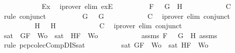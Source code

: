 \begin{isabellebody}
\ \ \ \ \ \ \ \ \ \ \isamarkupfalse%
\ Ex{}\ \isamarkupfalse%
\ {\isacharparenleft}iprover\ elim{\isacharcolon}\ exE{\isacharparenright}\isanewline
\ \ \ \ \ \ \ \ \isamarkupfalse%
\ {\isachardoublequoteopen}F\ {\isacharequal}\ \isactrlbold {\isasymnot}\ {\isacharparenleft}G{}\ \isactrlbold {\isasymand}\ H{}{\isacharparenright}{\isachardoublequoteclose}\isanewline
\ \ \ \ \ \ \ \ \ \ \isamarkupfalse%
\ C{}\ \isamarkupfalse%
\ {\isacharparenleft}rule\ conjunct{}{\isacharparenright}\isanewline
\ \ \ \ \ \ \ \ \isamarkupfalse%
\ {\isachardoublequoteopen}G\ {\isacharequal}\ \isactrlbold {\isasymnot}\ G{}{\isachardoublequoteclose}\isanewline
\ \ \ \ \ \ \ \ \ \ \isamarkupfalse%
\ C{}\ \isamarkupfalse%
\ {\isacharparenleft}iprover\ elim{\isacharcolon}\ conjunct{}{\isacharparenright}\isanewline
\ \ \ \ \ \ \ \ \isamarkupfalse%
\ {\isachardoublequoteopen}H\ {\isacharequal}\ \isactrlbold {\isasymnot}\ H{}{\isachardoublequoteclose}\isanewline
\ \ \ \ \ \ \ \ \ \ \isamarkupfalse%
\ C{}\ \isamarkupfalse%
\ {\isacharparenleft}iprover\ elim{\isacharcolon}\ conjunct{}{\isacharparenright}\isanewline
\ \ \ \ \ \ \ \ \isamarkupfalse%
\ {\isachardoublequoteopen}sat\ {\isacharparenleft}{\isacharbraceleft}\isactrlbold {\isasymnot}\ G{}{\isacharcomma}F{\isacharbraceright}\ {\isasymunion}\ Wo{\isacharparenright}\ {\isasymor}\ sat\ {\isacharparenleft}{\isacharbraceleft}\isactrlbold {\isasymnot}\ H{}{\isacharcomma}F{\isacharbraceright}\ {\isasymunion}\ Wo{\isacharparenright}{\isachardoublequoteclose}\isanewline
\ \ \ \ \ \ \ \ \ \ \isamarkupfalse%
\ assms{\isacharparenleft}{}{\isacharparenright}\ {\isacartoucheopen}F\ {\isacharequal}\ \isactrlbold {\isasymnot}\ {\isacharparenleft}G{}\ \isactrlbold {\isasymand}\ H{}{\isacharparenright}{\isacartoucheclose}\ assms{\isacharparenleft}{}{\isacharcomma}{}{\isacharcomma}{}{\isacharparenright}\ \isamarkupfalse%
\ {\isacharparenleft}rule\ pcp{\isacharunderscore}colecComp{\isacharunderscore}DIS{\isacharunderscore}sat{}{\isacharparenright}\isanewline
\ \ \ \ \ \ \ \ \isamarkupfalse%
\ {\isachardoublequoteopen}sat\ {\isacharparenleft}{\isacharbraceleft}G{\isacharcomma}F{\isacharbraceright}\ {\isasymunion}\ Wo{\isacharparenright}\ {\isasymor}\ sat\ {\isacharparenleft}{\isacharbraceleft}H{\isacharcomma}F{\isacharbraceright}\ {\isasymunion}\ Wo{\isacharparenright}{\isachardoublequoteclose}\isanewline

\end{isabellebody}
